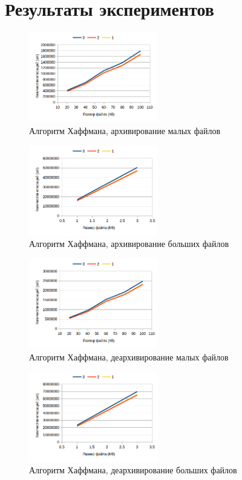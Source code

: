 \documentclass[a4paper,12pt]{article} %
\begin{document}
    \section{Результаты экспериментов}
    \begin{figure}[!htb]
        \caption{Алгоритм Хаффмана, архивирование малых файлов}
        \centering
        \includegraphics[width=0.5\textwidth]{graphs/1/hc_kb}
    \end{figure}
    \begin{figure}[!htb]
        \caption{Алгоритм Хаффмана, архивирование больших файлов}
        \centering
        \includegraphics[width=0.5\textwidth]{graphs/1/hc_mb}
    \end{figure}
    \begin{figure}[!htb]
        \caption{Алгоритм Хаффмана, деархивирование малых файлов}
        \centering
        \includegraphics[width=0.5\textwidth]{graphs/1/hd_kb}
    \end{figure}
    \begin{figure}[!htb]
        \caption{Алгоритм Хаффмана, деархивирование больших файлов}
        \centering
        \includegraphics[width=0.5\textwidth]{graphs/1/hd_mb}
    \end{figure}
\end{document}
